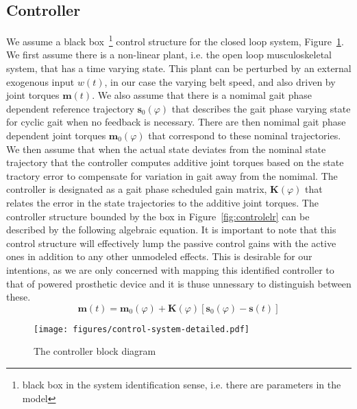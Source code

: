 \documentclass{article}
\begin{document}


\subsection*{Controller}
\label{sec:controller}
%
We assume a black box~\footnote{black box in the system identification sense,
i.e. there are parameters in the model} control structure for the closed loop
system, Figure~\ref{fig:controller}. We first assume there is a non-linear
plant, i.e. the open loop musculoskeletal system, that has a time varying
state. This plant can be perturbed by an external exogenous input $w(t)$, in
our case the varying belt speed, and also driven by joint torques
$\mathbf{m}(t)$. We also assume that there is a nomimal gait phase dependent
reference trajectory $\mathbf{s}_0(\varphi)$ that describes the gait phase
varying state for cyclic gait when no feedback is necessary. There are then
nomimal gait phase dependent joint torques $\mathbf{m}_0(\varphi)$ that
correspond to these nominal trajectories. We then assume that when the actual
state deviates from the nominal state trajectory that the controller computes
additive joint torques based on the state tractory error to compensate for
variation in gait away from the nomimal. The controller is designated as a gait
phase scheduled gain matrix, $\mathbf{K}(\varphi)$ that relates the error in
the state trajectories to the additive joint torques. The controller structure
bounded by the box in Figure~\ref{fig:controlelr} can be described by the
following algebraic equation. It is important to note that this control
structure will effectively lump the passive control gains with the active ones
in addition to any other unmodeled effects. This is desirable for our
intentions, as we are only concerned with mapping this identified controller to
that of powered prosthetic device and it is thuse unnessary to distinguish
between these.
%
\begin{equation}
  \mathbf{m}(t) = \mathbf{m}_0(\varphi) + \mathbf{K}(\varphi) [\mathbf{s}_0(\varphi) - \mathbf{s}(t)]
  \label{eq:controller}
\end{equation}

\begin{figure}
  \begin{center}
    \texttt{[image: figures/control-system-detailed.pdf]}
    \caption{The controller block diagram}
    \label{fig:controller}
  \end{center}
\end{figure}
\end{document}
